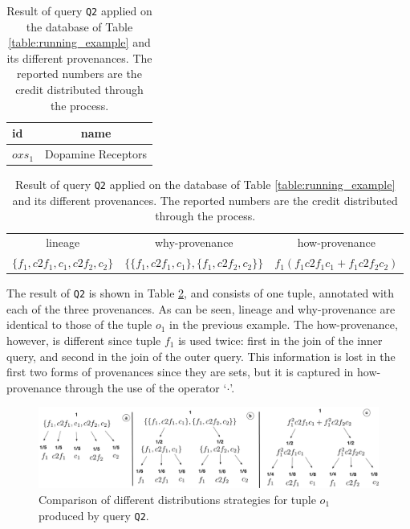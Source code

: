 \begin{table}[]
\centering
  \begin{tabular}{|l|c|}
  \hline
    id & name\\
    \hline
    $oxs_1$ &  Dopamine Receptors\\
    \hline
  \end{tabular}
  \newline
\vspace{2mm}
  \begin{tabular}{c | c | c}
  	lineage & why-provenance & how-provenance   \\
  	$\{f_1, c2f_1, c_1, c2f_2, c_2\}$ & $\{\{f_1, c2f_1, c_1\}, \{f_1, c2f_2, c_2\}\}$ & $f_1(f_1 c2f_1 c_1 + f_1 c2f_2 c_2)$\\
  \end{tabular}
    \caption{Result of query \texttt{Q2} applied on the database of Table \ref{table:running_example} and its different provenances. The reported numbers are the credit distributed through the process.}
  \label{table:difference_result}
\end{table}

The result of \texttt{Q2} is shown in Table \ref{table:difference_result}, and consists of one tuple, annotated with each of the three provenances. As can be seen, lineage and why-provenance are identical to those of the tuple $o_1$ in the previous example. 
The how-provenance, however, is different since tuple $f_1$ is used twice: first in the join of the inner query, and second in the join of the outer query. This information is lost in the first two forms of provenances since they are sets, but it is captured in how-provenance through the use of the operator `$\cdot$'.


\begin{figure}[]
  \includegraphics[width=\textwidth]{figures/how_distribution}
  \caption{Comparison of different distributions strategies for tuple $o_1$ produced by query \texttt{Q2}.}
  \label{figure:distributions_differences}
\end{figure}


